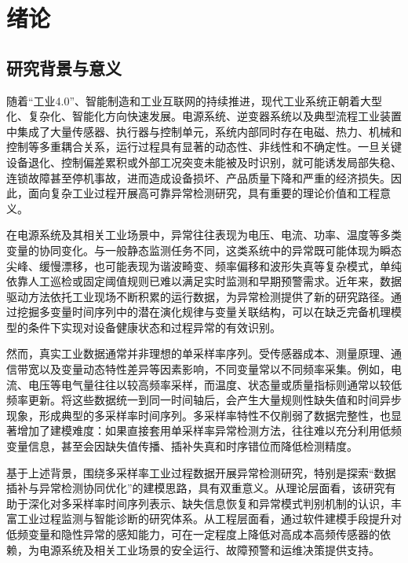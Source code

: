 
\chapter{绪论}
\label{chap:introduction}

\section{研究背景与意义}

随着``工业4.0''、智能制造和工业互联网的持续推进，现代工业系统正朝着大型化、复杂化、智能化方向快速发展。电源系统、逆变器系统以及典型流程工业装置中集成了大量传感器、执行器与控制单元，系统内部同时存在电磁、热力、机械和控制等多重耦合关系，运行过程具有显著的动态性、非线性和不确定性。一旦关键设备退化、控制偏差累积或外部工况突变未能被及时识别，就可能诱发局部失稳、连锁故障甚至停机事故，进而造成设备损坏、产品质量下降和严重的经济损失。因此，面向复杂工业过程开展高可靠异常检测研究，具有重要的理论价值和工程意义。

在电源系统及其相关工业场景中，异常往往表现为电压、电流、功率、温度等多类变量的协同变化。与一般静态监测任务不同，这类系统中的异常既可能体现为瞬态尖峰、缓慢漂移，也可能表现为谐波畸变、频率偏移和波形失真等复杂模式，单纯依靠人工巡检或固定阈值规则已难以满足实时监测和早期预警需求。近年来，数据驱动方法依托工业现场不断积累的运行数据，为异常检测提供了新的研究路径。通过挖掘多变量时间序列中的潜在演化规律与变量关联结构，可以在缺乏完备机理模型的条件下实现对设备健康状态和过程异常的有效识别。

然而，真实工业数据通常并非理想的单采样率序列。受传感器成本、测量原理、通信带宽以及变量动态特性差异等因素影响，不同变量常以不同频率采集。例如，电流、电压等电气量往往以较高频率采样，而温度、状态量或质量指标则通常以较低频率更新。将这些数据统一到同一时间轴后，会产生大量规则性缺失值和时间异步现象，形成典型的多采样率时间序列。多采样率特性不仅削弱了数据完整性，也显著增加了建模难度：如果直接套用单采样率异常检测方法，往往难以充分利用低频变量信息，甚至会因缺失值传播、插补失真和时序错位而降低检测精度。

基于上述背景，围绕多采样率工业过程数据开展异常检测研究，特别是探索``数据插补与异常检测协同优化''的建模思路，具有双重意义。从理论层面看，该研究有助于深化对多采样率时间序列表示、缺失信息恢复和异常模式判别机制的认识，丰富工业过程监测与智能诊断的研究体系。从工程层面看，通过软件建模手段提升对低频变量和隐性异常的感知能力，可在一定程度上降低对高成本高频传感器的依赖，为电源系统及相关工业场景的安全运行、故障预警和运维决策提供支持。


